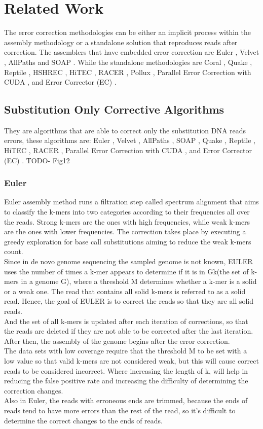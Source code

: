 \documentclass{llncs}
\begin{document}
\section{\label{sec:2}Related Work}
The error correction methodologies can be either an implicit process within the assembly methodology or a standalone solution that reproduces reads after correction. The assemblers that have embedded error correction are Euler \cite{Euler}, Velvet \cite{Velvet}, AllPaths \cite{AllPaths} and SOAP \cite{Soap}. While the standalone methodologies are Coral \cite{Coral}, Quake \cite{Quake}, Reptile \cite{Reptile}, HSHREC \cite{HShrec}, HiTEC \cite{HiTec}, RACER \cite{Racer}, Pollux \cite{Pollux}, Parallel Error Correction with CUDA \cite{Cuda}, and Error Corrector (EC) \cite{EC}.
\subsection{Substitution Only Corrective Algorithms}
They are algorithms that are able to correct only the substitution DNA reads errors, these algorithms are: Euler \cite{Euler}, Velvet \cite{Velvet}, AllPaths \cite{AllPaths}, SOAP \cite{Soap}, Quake \cite{Quake}, Reptile \cite{Reptile}, HiTEC \cite{HiTec}, RACER \cite{Racer}, Parallel Error Correction with CUDA \cite{Cuda}, and Error Corrector (EC) \cite{EC}. TODO- Fig12
\subsubsection{Euler}
Euler \cite{Euler} assembly method runs a filtration step called spectrum alignment that aims to classify the k-mers into two categories according to their frequencies all over the reads. Strong k-mers are the ones with high frequencies, while weak k-mers are the ones with lower frequencies. The correction takes place by executing a greedy exploration for base call substitutions aiming to reduce the weak k-mers count.
\\
Since in de novo genome sequencing the sampled genome is not known, EULER uses the number of times a k-mer appears to determine if it is in Gk(the set of k-mers in a genome G), where a threshold M determines whether a k-mer is a solid or a weak one. The read that contains all solid k-mers is referred to as a solid read. Hence, the goal of EULER is to correct the reads so that they are all solid reads.
\\
And the set of all k-mers is updated after each iteration of corrections, so that the reads are deleted if they are not able to be corrected after the last iteration. After then, the assembly of the genome begins after the error correction.
\\
The data sets with low coverage require that the threshold M to be set with a low value so that valid k-mers are not considered weak, but this will cause correct reads to be considered incorrect. 
Where increasing the length of k, will help in reducing the false positive rate and increasing the difficulty of determining the correction changes.
\\
Also in Euler, the reads with erroneous ends are trimmed, because the ends of reads tend to have more errors than the rest of the read, so it's difficult to determine the correct changes to the ends of reads.
\end{document}
